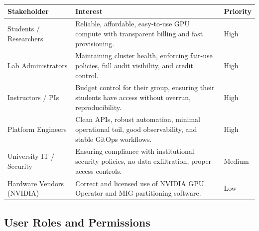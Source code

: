 \documentclass[12pt,a4paper]{article}
\begin{document}
\begin{tabularx}{\textwidth}{@{}L{3.5cm}X L{2.5cm}@{}}
  \textbf{Stakeholder} & \textbf{Interest} & \textbf{Priority} \\
  \midrule
  Students / Researchers
    & Reliable, affordable, easy-to-use GPU compute with transparent billing and fast provisioning.
    & High \\
  Lab Administrators
    & Maintaining cluster health, enforcing fair-use policies, full audit visibility, and credit control.
    & High \\
  Instructors / PIs
    & Budget control for their group, ensuring their students have access without overrun, reproducibility.
    & High \\
  Platform Engineers
    & Clean APIs, robust automation, minimal operational toil, good observability, and stable GitOps workflows.
    & High \\
  University IT / Security
    & Ensuring compliance with institutional security policies, no data exfiltration, proper access controls.
    & Medium \\
  Hardware Vendors (NVIDIA)
    & Correct and licensed use of NVIDIA GPU Operator and MIG partitioning software.
    & Low \\
\end{tabularx}

\subsection{User Roles and Permissions}
\end{document}
